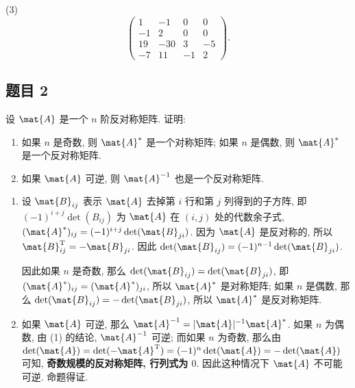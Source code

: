 \begin{solution}
(3)
\[
\left(\begin{matrix}
    1 & -1 & 0 & 0 \\
    -1 & 2 & 0 & 0 \\
    19 & -30 & 3 & -5 \\
    -7 & 11 & -1 & 2
\end{matrix}\right).
\]
\end{solution}

\subsection*{题目 2}
\begin{problem}
设 $\mat{A}$ 是一个 $n$ 阶反对称矩阵. 证明:
\begin{enumerate}
    \item 如果 $n$ 是奇数, 则 $\mat{A}^{\ast}$ 是一个对称矩阵; 如果 $n$ 是偶数, 则 $\mat{A}^{\ast}$ 是一个反对称矩阵.
    \item 如果 $\mat{A}$ 可逆, 则 $\mat{A}^{-1}$ 也是一个反对称矩阵.
\end{enumerate}
\end{problem}
\begin{solution}
\begin{enumerate}
    \item 设 $\mat{B}_{ij}$ 表示 $\mat{A}$ 去掉第 $i$ 行和第 $j$ 列得到的子方阵, 即 $(-1)^{i + j}\det(B_{ij})$ 为 $\mat{A}$ 在 $(i, j)$ 处的代数余子式, $(\mat{A}^{\ast})_{ij} = (-1)^{i + j}\det(\mat{B}_{ji})$. 因为 $\mat{A}$ 是反对称的, 所以 $\mat{B}_{ij}^{\mathrm{T}} = -\mat{B}_{ji}$. 因此 $\det(\mat{B}_{ij}) = (-1)^{n - 1}\det(\mat{B}_{ji})$. 
    
    因此如果 $n$ 是奇数, 那么 $\det(\mat{B}_{ij}) = \det(\mat{B}_{ji})$, 即 $(\mat{A}^{\ast})_{ij} = (\mat{A}^{\ast})_{ji}$, 所以 $\mat{A}^{\ast}$ 是对称矩阵; 如果 $n$ 是偶数, 那么 $\det(\mat{B}_{ij}) = -\det(\mat{B}_{ji})$, 所以 $\mat{A}^{\ast}$ 是反对称矩阵.
    \item 如果 $\mat{A}$ 可逆, 那么 $\mat{A}^{-1} = |\mat{A}|^{-1} \mat{A}^{\ast} $. 如果 $n$ 为偶数, 由 (1) 的结论, $\mat{A}^{-1}$ 可逆; 而如果 $n$ 为奇数, 那么由 $\det(\mat{A}) = \det(-\mat{A}^{\mathrm{T}}) = (-1)^{n}\det(\mat{A}) = -\det(\mat{A})$ 可知, \textbf{奇数规模的反对称矩阵, 行列式为 $0$}. 因此这种情况下 $\mat{A}$ 不可能可逆. 命题得证.
\end{enumerate}
\end{solution}

\newpage
